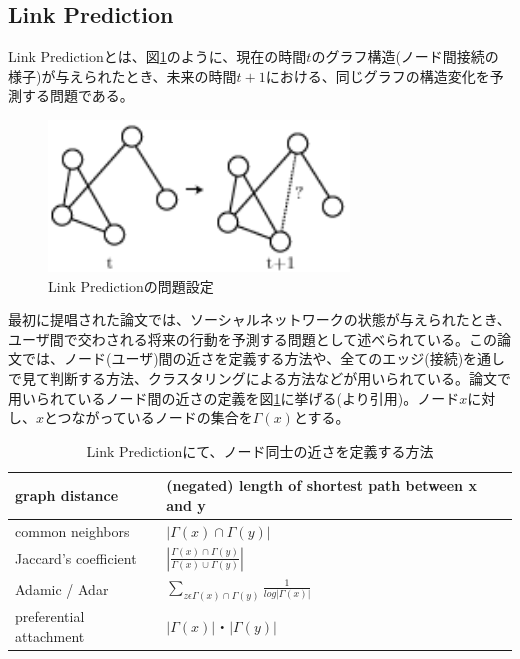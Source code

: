 \subsection{Link Prediction}
Link Predictionとは、図\ref{c2_link_prediction}のように、現在の時間$t$のグラフ構造(ノード間接続の様子)が与えられたとき、未来の時間$t+1$における、同じグラフの構造変化を予測する問題である。\par
\begin{figure}[tbp]
 \centering
  \includegraphics[width=80mm]{img/c2/link_prediction}
 \caption{Link Predictionの問題設定}
 \label{c2_link_prediction}
\end{figure}
最初に提唱された論文\cite{liben2007link}では、ソーシャルネットワークの状態が与えられたとき、ユーザ間で交わされる将来の行動を予測する問題として述べられている。この論文では、ノード(ユーザ)間の近さを定義する方法や、全てのエッジ(接続)を通しで見て判断する方法、クラスタリングによる方法などが用いられている。論文で用いられているノード間の近さの定義を図\ref{c2_lp_method}に挙げる(\cite{liben2007link}より引用)。ノード$x$に対し、$x$とつながっているノードの集合を$\Gamma(x)$とする。\par
\begin{table}[tbp]
 \begin{center}
  \begin{tabular}{|l|l|}\hline
  graph distance & (negated) length of shortest path between x and y \\ \hline
  common neighbors & $|\Gamma(x)∩\Gamma(y)|$ \\ \hline
  Jaccard's coefficient \cite{jaccard1902lois}& $\left| \frac{\Gamma(x)∩\Gamma(y)}{\Gamma(x)∪\Gamma(y)} \right|$ \\ \hline
  Adamic / Adar \cite{adamic2003friends}& $\sum_{z\epsilon \Gamma(x)∩\Gamma(y)} \frac{1}{log|\Gamma(x)|}$ \\ \hline
  preferential attachment & $|\Gamma(x)|・|\Gamma(y)|$ \\ \hline
  \end{tabular}
 \end{center}
 \caption{Link Predictionにて、ノード同士の近さを定義する方法}
 \label{c2_lp_method}
\end{table}

